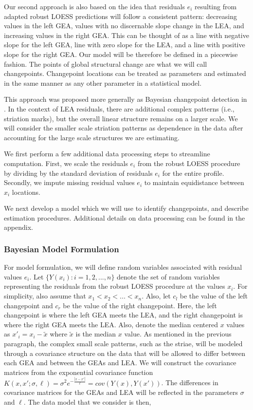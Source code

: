 \documentclass[12pt]{article}
\begin{document}
Our second approach is also based on the idea that residuals \(e_i\)
resulting from adapted robust LOESS predictions will follow a consistent
pattern: decreasing values in the left GEA, values with no discernable
slope change in the LEA, and increasing values in the right GEA. This
can be thought of as a line with negative slope for the left GEA, line
with zero slope for the LEA, and a line with positive slope for the
right GEA. Our model will be therefore be defined in a piecewise
fashion. The points of global structural change are what we will call
changepoints. Changepoint locations can be treated as parameters and
estimated in the same manner as any other parameter in a statistical
model.

This approach was proposed more generally as Bayesian changepoint
detection in \citet{stephens1994}. In the context of LEA residuals,
there are additional complex patterns (i.e., striation marks), but the
overall linear structure remains on a larger scale. We will consider the
smaller scale striation patterns as dependence in the data after
accounting for the large scale structures we are estimating.

We first perform a few additional data processing steps to streamline
computation. First, we scale the residuals \(e_i\) from the robust LOESS
procedure by dividing by the standard deviation of residuals \(e_i\) for
the entire profile. Secondly, we impute missing residual values \(e_i\)
to maintain equidistance between \(x_i\) locations.

We next develop a model which we will use to identify changepoints, and
describe estimation procedures. Additional details on data processing
can be found in the appendix.

\subsubsection{Bayesian Model Formulation}

For model formulation, we will define random variables associated with
residual values \(e_i\). Let \(\{Y(x_i): i = 1,2, ..., n\}\) denote the
set of random variables representing the residuals from the robust LOESS
procedure at the values \(x_i\). For simplicity, also assume that
\(x_1 < x_2 < ... < x_n\). Also, let \(c_l\) be the value of the left
changepoint and \(c_r\) be the value of the right changepoint. Here, the
left changepoint is where the left GEA meets the LEA, and the right
changepoint is where the right GEA meets the LEA. Also, denote the
median centered \(x\) values as \(x'_i = x_i - \tilde{x}\) where
\(\tilde{x}\) is the median \(x\) value. As mentioned in the previous
paragraph, the complex small scale patterns, such as the striae, will be
modeled through a covariance structure on the data that will be allowed
to differ between each GEA and between the GEAs and LEA. We will
construct the covariance matrices from the exponential covariance
function
\(K(x, x';\sigma, \ell) = \sigma^2 e^{-\frac{|x - x'|}{\ell}} = cov(Y(x), Y(x'))\).
The differences in covariance matrices for the GEAs and LEA will be
reflected in the parameters \(\sigma\) and \(\ell\). The data model that
we consider is then,
\end{document}
